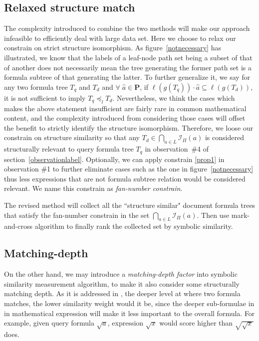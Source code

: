 \subsection{Relaxed structure match}
The complexity introduced to combine the two methods will make our approach infeasible to efficiently deal with large data set. 
Here we choose to relax our constrain on strict structure isomorphism. 
As figure~\ref{notnecessary} has illustrated, we know that the labels of a leaf-node path set being a subset of that of another does not necessarily mean the tree generating the former path set is a formula subtree of that generating the latter.
To further generalize it, we say for any two formula tree $T_q$ and $T_d$ and $\forall\; \hat{a} \in \mathbf{P}$, if $\ell(g(T_q)) \cdot \hat{a} \subseteq \ell(g(T_d))$, it is not sufficient to imply $T_q \preceq_l T_d$.
Nevertheless, we think the cases which makes the above statement insufficient are fairly rare in common mathematical content, and the complexity introduced from considering those cases will offset the benefit to strictly identify the structure isomorphism.
Therefore, we loose our constrain on structure similarity so that any  $T_d \in \bigcap_{a \in L} \mathcal{I}_{\Pi}(a) $ is considered structurally relevant to query formula tree $T_q$ in observation~\#4 of section~\ref{observationlabel}.
Optionally, we can apply constrain \ref{prop1} in observation \#1 to further eliminate cases such as the one in figure~\ref{notnecessary} thus less expressions that are not formula subtree relation would be considered relevant. We name this constrain as \textit{fan-number constrain}.

The revised method will collect all the ``structure similar" document formula trees that satisfy the fan-number constrain in the set $\bigcap_{a \in L} \mathcal{I}_{\Pi}(a)$. 
Then use mark-and-cross algorithm to finally rank the collected set by symbolic similarity.

\subsection{Matching-depth}
On the other hand, we may introduce a \textit{matching-depth factor} into symbolic similarity measurement algorithm, to make it also consider some structurally matching depth. 
As it is addressed in \cite{mias11a}, the deeper level at where two formula matches, the lower similarity weight would it be, since the deeper sub-formulae in in mathematical expression will make it less important to the overall formula.
For example, given query formula $\sqrt a$, expression $\sqrt {x}$ would score higher than $\sqrt{\sqrt{x}}$ does. 

